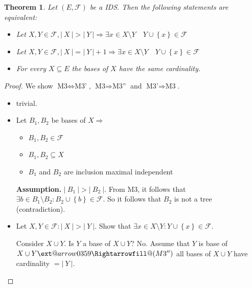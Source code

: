 \documentclass{article}
\makeatletter
\newtheorem{theorem}{Theorem}
\newcommand{\card}[1]{\left|\:\!#1\:\!\right|}
\newcommand{\set}[1]{\left\{#1\right\}}
\newcommand{\xRightarrow}[2][]{\ext@arrow 0359\Rightarrowfill@{#1}{#2}}
\makeatother
\begin{document}
\begin{theorem}
  \label{satz-6.2}
  Let $(E, \mathcal{F})$ be a IDS. Then the following statements are equivalent:
  \begin{itemize}
    \item[M3:] Let $X, Y \in \mathcal{F}, \card{X} > \card{Y} \Rightarrow \exists x \in X \setminus Y \quad Y \cup \set{x} \in \mathcal{F}$
    \item[M3':] Let $X, Y \in \mathcal{F}, \card{X} = \card{Y} + 1 \Rightarrow \exists x \in X \setminus Y \quad Y \cup \set{x} \in \mathcal{F}$
    \item[M3'':] For every $X \subseteq E$ the bases of $X$ have the same cardinality.
  \end{itemize}
\end{theorem}

\begin{proof}
  We show $\text{M3} \Leftrightarrow \text{M3'}$, $\text{M3} \Rightarrow \text{M3''}$ and $\text{M3'} \Rightarrow \text{M3}$.

  \begin{itemize}
    \item[$\text{M3} \Leftrightarrow \text{M3'}$] trivial.
    \item[$\text{M3} \Rightarrow \text{M3''}$]

      Let $B_1, B_2$ be bases of $X \Rightarrow$
      \begin{itemize}
        \item $B_1, B_2 \in \mathcal{F}$
        \item $B_1, B_2 \subseteq X$
        \item $B_1$ and $B_2$ are inclusion maximal independent
      \end{itemize}

      \textbf{Assumption.} $\card{B_1} > \card{B_2}$.
      From M3, it follows that $\exists b \in B_1 \setminus B_2: B_2 \cup \set{b} \in \mathcal{F}$.
      So it follows that $B_2$ is not a tree (contradiction).

  \item[$\text{M3'} \Rightarrow \text{M3}$]

    Let $X, Y \in \mathcal{F}: \card{X} > \card{Y}$. Show that $\exists x \in X \setminus Y: Y \cup \set{x} \in \mathcal{F}$.

    Consider $X \cup Y$. Is $Y$ a base of $X \cup Y$? No.
    Assume that $Y$ is base of $X \cup Y \xRightarrow{(M3'')}$ all bases of $X \cup Y$ have cardinality $= \card{Y}$.


\end{itemize}
\end{proof}
\end{document}
